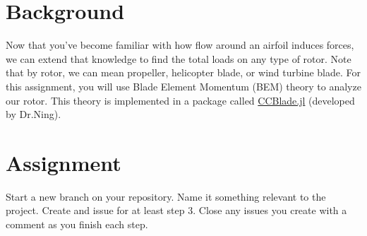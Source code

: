 \documentclass[12pt]{article}
\begin{document}
	
\section{Background}

Now that you've become familiar with how flow around an airfoil induces forces, we can extend that knowledge to find the total loads on any type of rotor. Note that by rotor, we can mean propeller, helicopter blade, or wind turbine blade. For this assignment, you will use Blade Element Momentum (BEM) theory to analyze our rotor.  This theory is implemented in a package called \href{https://github.com/byuflowlab/CCBlade.jl}{CCBlade.jl} (developed by Dr.Ning). 


\section{Assignment}
Start a new branch on your repository. Name it something relevant to the project. Create and issue for at least step 3. Close any issues you create with a comment as you finish each step. 
\end{document}
